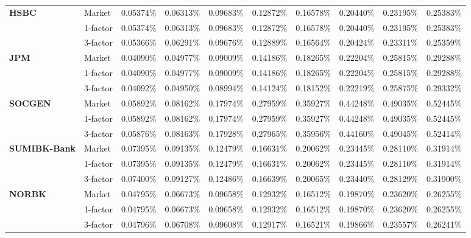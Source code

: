 \documentclass[12pt,a4paper]{article}
\theoremstyle{plain}
\numberwithin{equation}{section}
\begin{document}
{\begin{table}[t]
{\begin{tabular}{|rl|cccccccc|}
    \hline
    \hline
    \multicolumn{1}{|l}{\textbf{HSBC}} & Market & 0.05374\% & 0.06313\% & 0.09683\% & 0.12872\% & 0.16578\% & 0.20440\% & 0.23195\% & 0.25383\% \\
\cline{3-10}          & 1-factor & 0.05374\% & 0.06313\% & 0.09683\% & 0.12872\% & 0.16578\% & 0.20440\% & 0.23195\% & 0.25383\% \\
          & 3-factor & 0.05366\% & 0.06291\% & 0.09676\% & 0.12889\% & 0.16564\% & 0.20424\% & 0.23311\% & 0.25359\% \\
    \hline
    \hline
    \multicolumn{1}{|l}{\textbf{JPM}} & Market & 0.04090\% & 0.04977\% & 0.09009\% & 0.14186\% & 0.18265\% & 0.22204\% & 0.25815\% & 0.29288\% \\
\cline{3-10}          & 1-factor & 0.04090\% & 0.04977\% & 0.09009\% & 0.14186\% & 0.18265\% & 0.22204\% & 0.25815\% & 0.29288\% \\
          & 3-factor & 0.04092\% & 0.04950\% & 0.08994\% & 0.14124\% & 0.18152\% & 0.22219\% & 0.25875\% & 0.29332\% \\
    \hline
    \hline
    \multicolumn{1}{|l}{\textbf{SOCGEN}} & Market & 0.05892\% & 0.08162\% & 0.17974\% & 0.27959\% & 0.35927\% & 0.44248\% & 0.49035\% & 0.52445\% \\
\cline{3-10}          & 1-factor & 0.05892\% & 0.08162\% & 0.17974\% & 0.27959\% & 0.35927\% & 0.44248\% & 0.49035\% & 0.52445\% \\
          & 3-factor & 0.05876\% & 0.08163\% & 0.17928\% & 0.27965\% & 0.35956\% & 0.44160\% & 0.49045\% & 0.52414\% \\
    \hline
    \hline
    \multicolumn{1}{|l}{\textbf{SUMIBK-Bank}} & Market & 0.07395\% & 0.09135\% & 0.12479\% & 0.16631\% & 0.20062\% & 0.23445\% & 0.28110\% & 0.31914\% \\
\cline{3-10}          & 1-factor & 0.07395\% & 0.09135\% & 0.12479\% & 0.16631\% & 0.20062\% & 0.23445\% & 0.28110\% & 0.31914\% \\
          & 3-factor & 0.07400\% & 0.09127\% & 0.12486\% & 0.16639\% & 0.20065\% & 0.23440\% & 0.28129\% & 0.31900\% \\
    \hline
    \hline
    \multicolumn{1}{|l}{\textbf{NORBK}} & Market & 0.04795\% & 0.06673\% & 0.09658\% & 0.12932\% & 0.16512\% & 0.19870\% & 0.23620\% & 0.26255\% \\
\cline{3-10}          & 1-factor & 0.04795\% & 0.06673\% & 0.09658\% & 0.12932\% & 0.16512\% & 0.19870\% & 0.23620\% & 0.26255\% \\
          & 3-factor & 0.04796\% & 0.06708\% & 0.09608\% & 0.12917\% & 0.16521\% & 0.19866\% & 0.23557\% & 0.26241\% \\

\end{tabular}}
\end{table}}
\end{document}
